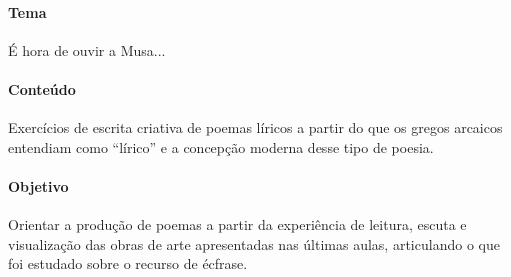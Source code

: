 \documentclass[12pt]{extarticle}
\begin{document}




\paragraph{Tema} É hora de ouvir a Musa...  

\paragraph{Conteúdo} Exercícios de escrita criativa de poemas líricos a partir
do que os gregos arcaicos entendiam como ``lírico'' e a concepção moderna
desse tipo de poesia. 

\paragraph{Objetivo} Orientar a produção de poemas a partir da experiência
de leitura, escuta e visualização das obras de arte apresentadas nas últimas
aulas, articulando o que foi estudado sobre o recurso de écfrase.
\end{document}
